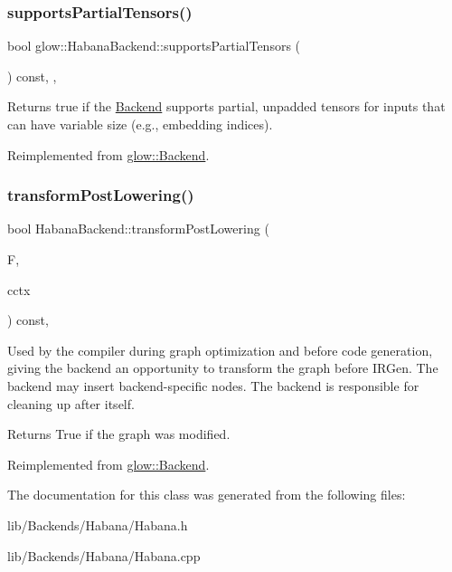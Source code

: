\subsubsection{\texorpdfstring{supports\+Partial\+Tensors()}{supportsPartialTensors()}}
{\footnotesize\ttfamily bool glow\+::\+Habana\+Backend\+::supports\+Partial\+Tensors (\begin{DoxyParamCaption}{ }\end{DoxyParamCaption}) const\hspace{0.3cm}{\ttfamily [inline]}, {\ttfamily [override]}, {\ttfamily [virtual]}}

\begin{DoxyReturn}{Returns}
true if the \hyperlink{classglow_1_1_backend}{Backend} supports partial, unpadded tensors for inputs that can have variable size (e.\+g., embedding indices). 
\end{DoxyReturn}


Reimplemented from \hyperlink{classglow_1_1_backend_a930556ce803696ca2ffe8d66c9ba5401}{glow\+::\+Backend}.

\mbox{\label{classglow_1_1_habana_backend_a84fed53bd3602fd2824bcab2786c8207}} 
\subsubsection{\texorpdfstring{transform\+Post\+Lowering()}{transformPostLowering()}}
{\footnotesize\ttfamily bool Habana\+Backend\+::transform\+Post\+Lowering (\begin{DoxyParamCaption}\item[{\hyperlink{classglow_1_1_function}{Function} $\ast$}]{F,  }\item[{\hyperlink{structglow_1_1_compilation_context}{Compilation\+Context} \&}]{cctx }\end{DoxyParamCaption}) const\hspace{0.3cm}{\ttfamily [override]}, {\ttfamily [virtual]}}

Used by the compiler during graph optimization and before code generation, giving the backend an opportunity to transform the graph before I\+R\+Gen. The backend may insert backend-\/specific nodes. The backend is responsible for cleaning up after itself. \begin{DoxyReturn}{Returns}
True if the graph was modified. 
\end{DoxyReturn}


Reimplemented from \hyperlink{classglow_1_1_backend_a299652a58fc137b15c69858048980452}{glow\+::\+Backend}.



The documentation for this class was generated from the following files\+:\begin{DoxyCompactItemize}
\item 
lib/\+Backends/\+Habana/Habana.\+h\item 
lib/\+Backends/\+Habana/Habana.\+cpp\end{DoxyCompactItemize}
